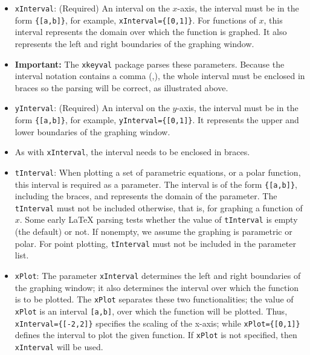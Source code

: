 \documentclass{article}
\begin{document}
\begin{enumerate}
\begin{itemize}
    \item \texttt{xInterval}: (Required) An interval on the $x$-axis, the
        interval must be in the form \verb!{[a,b]}!, for example,
        \verb!xInterval={[0,1]}!. For functions of $x$, this interval
        represents the domain over which the function is graphed. It
        also represents the left and right boundaries of the graphing
        window.

    \item[] \textbf{Important:} The \texttt{xkeyval} package
        parses these parameters. Because the interval notation
        contains a comma (,), the whole interval must be enclosed in
        braces so the parsing will be correct, as illustrated above.

    \item\texttt{yInterval}: (Required) An interval on the $y$-axis, the
        interval must be in the form \verb!{[a,b]}!, for
        example, \verb!yInterval={[0,1]}!. It represents
        the upper and lower boundaries of the graphing window.

    \item[] As with \texttt{xInterval}, the interval needs to be
        enclosed in braces.

    \item\texttt{tInterval}: When plotting a set of parametric equations, or
        a polar function, this interval is required as a parameter. The
        interval is of the form \verb!{[a,b]}!, including the braces,
        and represents the domain of the parameter. The
        \texttt{tInterval} must not be included otherwise, that is, for
        graphing a function of $x$. Some early {\LaTeX} parsing tests
        whether the value of \texttt{tInterval} is empty (the default)
        or not. If nonempty, we assume the graphing is parametric or
        polar. For point plotting, \texttt{tInterval} must not be
        included in the parameter list.

    \item\texttt{xPlot}: The parameter \texttt{xInterval} determines
        the left and right boundaries of the graphing window; it also
        determines the interval over which the function is to be plotted.
        The \texttt{xPlot} separates these two functionalities; the value
        of \texttt{xPlot} is an interval \verb![a,b]!, over which the
        function will be plotted. Thus, \verb!xInterval={[-2,2]}! specifies
        the scaling of the x-axis; while \verb!xPlot={[0,1]}! defines
        the interval to plot the given function. If \texttt{xPlot} is not
        specified, then \texttt{xInterval} will be used.


\end{itemize}
\end{enumerate}
\end{document}
